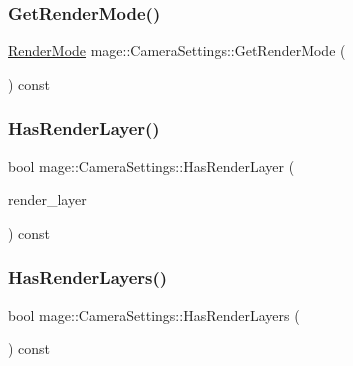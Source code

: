 \subsubsection{\texorpdfstring{Get\+Render\+Mode()}{GetRenderMode()}}
{\footnotesize\ttfamily \hyperlink{namespacemage_a5e7e18b0154373ce8fc942fe3f6b27fd}{Render\+Mode} mage\+::\+Camera\+Settings\+::\+Get\+Render\+Mode (\begin{DoxyParamCaption}{ }\end{DoxyParamCaption}) const\hspace{0.3cm}{\ttfamily [noexcept]}}

\hypertarget{classmage_1_1_camera_settings_a5f5f7e1019db2e65cddc1a62ae30efc7}{}\label{classmage_1_1_camera_settings_a5f5f7e1019db2e65cddc1a62ae30efc7} 
\subsubsection{\texorpdfstring{Has\+Render\+Layer()}{HasRenderLayer()}}
{\footnotesize\ttfamily bool mage\+::\+Camera\+Settings\+::\+Has\+Render\+Layer (\begin{DoxyParamCaption}\item[{\hyperlink{namespacemage_a8b4a82582105b0299e2c2be5af7255d6}{Render\+Layer}}]{render\+\_\+layer }\end{DoxyParamCaption}) const\hspace{0.3cm}{\ttfamily [noexcept]}}

\hypertarget{classmage_1_1_camera_settings_a838dfb8f3d32d3d23a7c72719ce182f3}{}\label{classmage_1_1_camera_settings_a838dfb8f3d32d3d23a7c72719ce182f3} 
\subsubsection{\texorpdfstring{Has\+Render\+Layers()}{HasRenderLayers()}}
{\footnotesize\ttfamily bool mage\+::\+Camera\+Settings\+::\+Has\+Render\+Layers (\begin{DoxyParamCaption}{ }\end{DoxyParamCaption}) const\hspace{0.3cm}{\ttfamily [noexcept]}}

